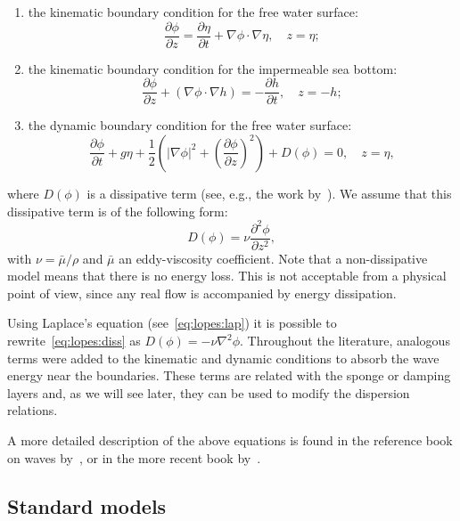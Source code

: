 \begin{enumerate}
\item the kinematic boundary condition for the free water
  surface:
  \begin{equation}
    \frac{\partial \phi}{\partial
      z}=\frac{\partial\eta}{\partial
      t}+\nabla\phi\cdot\nabla\eta,\quad z=\eta;
  \end{equation}
\item the kinematic boundary condition for the
  impermeable sea bottom:
  \begin{equation}
    \frac{\partial \phi}{\partial z}+(\nabla\phi\cdot\nabla
    h)=-\frac{\partial h}{\partial t}, \quad z=-h;
  \end{equation}
\item the dynamic boundary condition for the
  free water surface:\vspace*{-4pt}
  \begin{equation}\label{eq:lopes:dyn}
    \frac{\partial \phi}{\partial t}+ g\eta+\frac{1}{2}
    \left(|\nabla\phi|^2 + \left(\frac{\partial \phi}{\partial
          z}\right)^2\right)+ D(\phi) = 0, \quad z =\eta,
  \end{equation}
\end{enumerate}
where $D(\phi)$ is a dissipative term (see, e.g., the work
by~\citet{DutykhDias2007}).  We assume that this dissipative term is
of the following form:
\begin{equation}
  \label{eq:lopes:diss}
  D(\phi)=\nu\frac{\partial ^2\phi}{\partial z^2},
\end{equation}
with $\nu=\bar{\mu}/\rho$ and $\bar{\mu}$ an eddy-viscosity
coefficient.  Note that a non-dissipative model means that there is no
energy loss.  This is not acceptable from a physical point of view,
since any real flow is accompanied by energy dissipation.

Using Laplace's equation (see~\eqref{eq:lopes:lap}) it is possible to
rewrite~\eqref{eq:lopes:diss} as $D(\phi)=-\nu\nabla^2\phi$.
Throughout the literature, analogous terms were added to the kinematic
and dynamic conditions\vadjust{\pagebreak} to absorb the wave energy near the boundaries.
These terms are related with the sponge or damping layers and, as we
will see later, they can be used to modify the dispersion relations.

A more detailed description of the above equations is found in the
reference book on waves by~\citet{Whitham1974}, or in the more recent
book by~\citet{Johnson1997}.

\subsection{Standard models}

